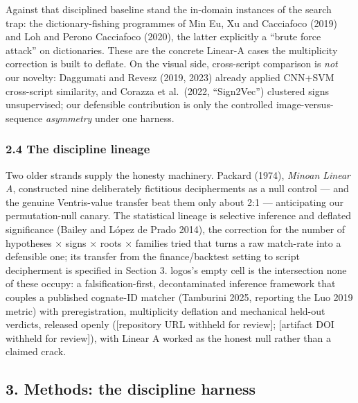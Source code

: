 \documentclass[
  10pt,
]{article}
\begin{document}
Against that disciplined baseline stand the in-domain instances of the
search trap: the dictionary-fishing programmes of Min Eu, Xu and
Cacciafoco (2019) and Loh and Perono Cacciafoco (2020), the latter
explicitly a ``brute force attack'' on dictionaries. These are the
concrete Linear-A cases the multiplicity correction is built to deflate.
On the visual side, cross-script comparison is \emph{not} our novelty:
Daggumati and Revesz (2019, 2023) already applied CNN+SVM cross-script
similarity, and Corazza et al.~(2022, ``Sign2Vec'') clustered signs
unsupervised; our defensible contribution is only the controlled
image-versus-sequence \emph{asymmetry} under one harness.

\hypertarget{the-discipline-lineage}{%
\subsubsection{2.4 The discipline
lineage}\label{the-discipline-lineage}}

Two older strands supply the honesty machinery. Packard (1974),
\emph{Minoan Linear A}, constructed nine deliberately fictitious
decipherments as a null control --- and the genuine Ventris-value
transfer beat them only about 2:1 --- anticipating our permutation-null
canary. The statistical lineage is selective inference and deflated
significance (Bailey and López de Prado 2014), the correction for the
number of hypotheses × signs × roots × families tried that turns a raw
match-rate into a defensible one; its transfer from the finance/backtest
setting to script decipherment is specified in Section 3. logos's empty
cell is the intersection none of these occupy: a falsification-first,
decontaminated inference framework that couples a published cognate-ID
matcher (Tamburini 2025, reporting the Luo 2019 metric) with
preregistration, multiplicity deflation and mechanical held-out
verdicts, released openly ({[}repository URL withheld for review{]};
{[}artifact DOI withheld for review{]}), with Linear A worked as the
honest null rather than a claimed crack.

\hypertarget{methods-the-discipline-harness}{%
\subsection{3. Methods: the discipline
harness}\label{methods-the-discipline-harness}}
\end{document}
